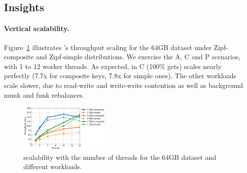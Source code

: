 
\subsection{Insights}
\label{ssec:drill} 

\paragraph{Vertical scalability.} 
Figure~\ref{fig:scalability} illustrates \sys's throughput scaling for the 64GB dataset under Zipf-composite and Zipf-simple  
distributions. We exercise the A, C and P scenarios, with 1 to 12 worker threads.  
As expected, in C (100\% gets) \sys\/ scales nearly perfectly (7.7x for composite keys, 7.8x for simple ones). 
The other workloads scale slower, due to read-write and write-write contention as well as background munk and funk rebalances. 

\begin{figure}[th]
\centering
\includegraphics[width=0.4\textwidth]{figs/scalability_line.pdf}

\caption{{\sys\/ scalability with the number of threads for 
the 64GB dataset and different workloads. }}
\label{fig:scalability}
\end{figure}

